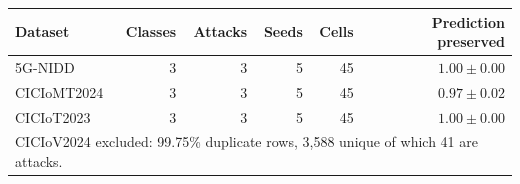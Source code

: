 \begin{tabular}{lrrrrr}
\toprule
\textbf{Dataset} & \textbf{Classes} & \textbf{Attacks} & \textbf{Seeds} & \textbf{Cells} & \textbf{Prediction preserved} \\
\midrule
5G-NIDD & 3 & 3 & 5 & 45 & $1.00 \pm 0.00$ \\
CICIoMT2024 & 3 & 3 & 5 & 45 & $0.97 \pm 0.02$ \\
CICIoT2023 & 3 & 3 & 5 & 45 & $1.00 \pm 0.00$ \\
\midrule
\multicolumn{6}{l}{\footnotesize CICIoV2024 excluded: 99.75\% duplicate rows, 3{,}588 unique of which 41 are attacks.} \\
\bottomrule
\end{tabular}
